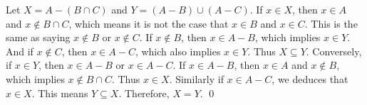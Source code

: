   {Let
  \(X = A - (B \cap C)\) and \(Y = (A-B) \cup (A-C)\).  If
  \(x \in X\), then \(x \in A\) and \(x \notin B \cap C\), which means
  it is not the case that \(x \in B\) and \(x \in C\).  This is the
  same as saying \(x \notin B\) or \(x \notin C\).  If \(x \notin B\),
  then \(x \in A-B\), which implies \(x \in Y\).  And if
  \(x \notin C\), then \(x \in A-C\), which also implies \(x \in Y\).
  Thus \(X \subseteq Y\).  Conversely, if \(x \in Y\), then
  \(x \in A-B\) or \(x \in A-C\).  If \(x \in A-B\), then \(x \in A\)
  and \(x \notin B\), which implies \(x \notin B \cap C\).  Thus
  \(x \in X\).  Similarly if \(x \in A-C\), we deduces that
  \(x \in X\).  This means \(Y \subseteq X\).  Therefore, \(X =
  Y\). \qed}

